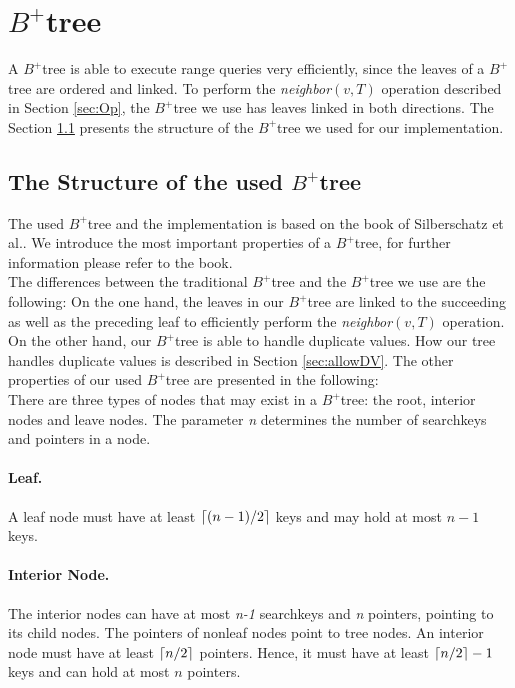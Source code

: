 \documentclass[abstracton,12pt]{scrreprt}
\DeclarePairedDelimiter\ceil{\lceil}{\rceil}
\begin{document}
\newpage
\section{$B^+$tree}
\label{sec:BplusTree}
A $B^+$tree is able to execute range queries very efficiently, since the leaves of a $B^+$tree are ordered and linked. To perform the \emph{neighbor}$(v,T)$ operation described in Section \ref{sec:Op}, the $B^+$tree we use has leaves linked in both directions. The Section \ref{structureBtree} presents the structure of the $B^+$tree we used for our implementation.

\subsection{The Structure of the used $B^+$tree}
\label{structureBtree}
The used $B^+$tree and the implementation is based on the book of Silberschatz et al.\cite{DatabaseSystemC}. We introduce the most important properties of a $B^+$tree, for further information please refer to the book.\\
The differences between the traditional $B^+$tree and the $B^+$tree we use are the following: On the one hand, the leaves in our $B^+$tree are linked to the succeeding as well as the preceding leaf to efficiently perform the \emph{neighbor}$(v,T)$ operation. On the other hand, our $B^+$tree is able to handle duplicate values. How our tree handles duplicate values is described in Section \ref{sec:allowDV}. The other properties of our used $B^+$tree are presented in the following:\\
There are three types of nodes that may exist in a $B^+$tree: the root, interior nodes and leave nodes. The parameter \emph{n} determines the number of searchkeys and pointers in a node.

\paragraph{Leaf.}
A leaf node must have at least $\ceil{(n-1)/2}$ keys and may hold at most $n-1$ keys.
\paragraph{Interior Node.}
The interior nodes can have at most \emph{n-1} searchkeys and \emph{n} pointers, pointing to its child nodes. The pointers of nonleaf nodes point to tree nodes. An interior node must have at least $\ceil{n/2}$ pointers. Hence, it must have at least $\ceil{n/2}-1$ keys and can hold at most $n$ pointers.
\end{document}
